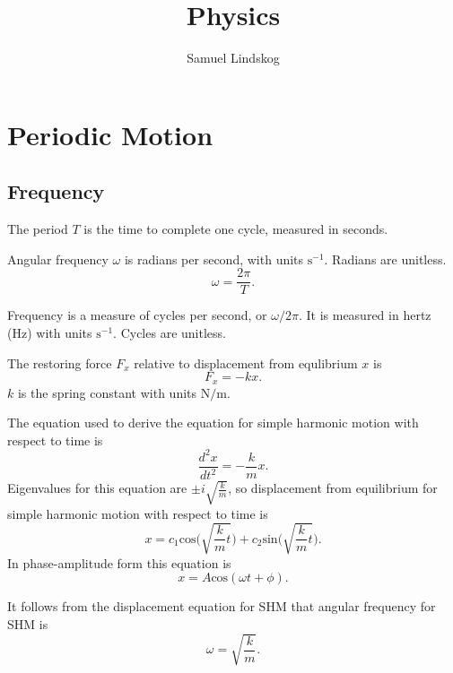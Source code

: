 \documentclass{article}
\title{Physics}
\author{Samuel Lindskog}
\begin{document}
\maketitle
{}
\tableofcontents
{}
\clearpage
{}
\setcounter{page}{1}

\section{Periodic Motion}
\subsection{Frequency}
\begin{definition}[Period]
	The period \(T\) is the time to complete one cycle, measured in seconds.
\end{definition}
\begin{definition}
	Angular frequency \(\omega\) is radians per second, with units \(\text{s}^{-1}\). Radians are unitless.
	\begin{equation*}
		\omega=\frac{2\pi}{T}.
	\end{equation*}
\end{definition}
\begin{definition}[Frequency]
	Frequency is a measure of cycles per second, or \(\omega/2\pi\). It is measured in hertz (Hz) with units \(\text{s}^{-1}\). Cycles are unitless.
\end{definition}
\begin{definition}
	The restoring force \(F_x\) relative to displacement from equlibrium \(x\) is
	\begin{equation*}
		F_x=-kx.
	\end{equation*}
	\(k\) is the spring constant with units \(\text{N}/\text{m}\).
\end{definition}
\begin{definition}
	The equation used to derive the equation for simple harmonic motion with respect to time is
	\begin{equation*}
		\frac{d^2x}{dt^2}=-\frac{k}{m}x.
	\end{equation*}
	Eigenvalues for this equation are \(\pm i\sqrt{\frac{k}{m}}\), so displacement from equilibrium for simple harmonic motion with respect to time is
	\begin{equation*}
		x=c_1\text{cos}\bigg(\sqrt{\frac{k}{m}t}\bigg)+c_2\text{sin}\bigg(\sqrt{\frac{k}{m}t}\bigg).
	\end{equation*}
	In phase-amplitude form this equation is
	\begin{equation*}
		x=A\text{cos}(\omega t+\phi).
	\end{equation*}
\end{definition}
\begin{definition}
	It follows from the displacement equation for SHM that angular frequency for SHM is
	\begin{equation*}
		\omega=\sqrt{\frac{k}{m}}.
	\end{equation*}
\end{definition}
\end{document}
